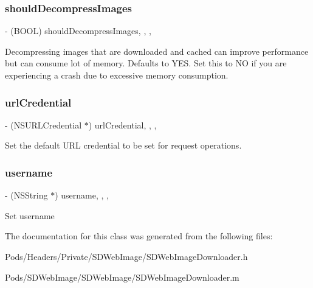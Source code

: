 \subsubsection{\texorpdfstring{should\+Decompress\+Images}{shouldDecompressImages}}
{\footnotesize\ttfamily -\/ (B\+O\+OL) should\+Decompress\+Images\hspace{0.3cm}{\ttfamily [read]}, {\ttfamily [write]}, {\ttfamily [nonatomic]}, {\ttfamily [assign]}}

Decompressing images that are downloaded and cached can improve performance but can consume lot of memory. Defaults to Y\+ES. Set this to NO if you are experiencing a crash due to excessive memory consumption. \mbox{\label{interface_s_d_web_image_downloader_adcc405c7347908892553755d566d25a5}} 
\subsubsection{\texorpdfstring{url\+Credential}{urlCredential}}
{\footnotesize\ttfamily -\/ (N\+S\+U\+R\+L\+Credential $\ast$) url\+Credential\hspace{0.3cm}{\ttfamily [read]}, {\ttfamily [write]}, {\ttfamily [nonatomic]}, {\ttfamily [strong]}}

Set the default U\+RL credential to be set for request operations. \mbox{\label{interface_s_d_web_image_downloader_a2d5ff61c6369936cafd3a74a936131cd}} 
\subsubsection{\texorpdfstring{username}{username}}
{\footnotesize\ttfamily -\/ (N\+S\+String $\ast$) username\hspace{0.3cm}{\ttfamily [read]}, {\ttfamily [write]}, {\ttfamily [nonatomic]}, {\ttfamily [strong]}}

Set username 

The documentation for this class was generated from the following files\+:\begin{DoxyCompactItemize}
\item 
Pods/\+Headers/\+Private/\+S\+D\+Web\+Image/S\+D\+Web\+Image\+Downloader.\+h\item 
Pods/\+S\+D\+Web\+Image/\+S\+D\+Web\+Image/S\+D\+Web\+Image\+Downloader.\+m\end{DoxyCompactItemize}
